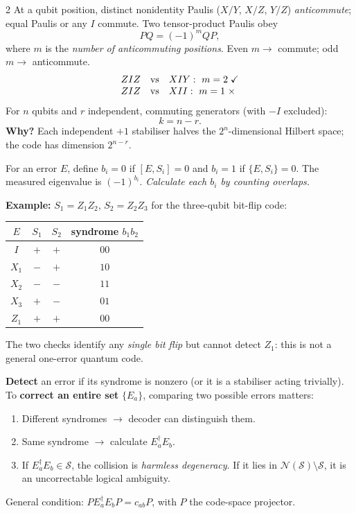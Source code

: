 \begin{multicols}{2}
At a qubit position, distinct nonidentity Paulis ($X/Y$, $X/Z$, $Y/Z$) \emph{anticommute}; equal Paulis or any $I$ commute. Two tensor-product Paulis obey
\[PQ=(-1)^mQP,\]
where $m$ is the \emph{number of anticommuting positions}. Even $m\to$ commute; odd $m\to$ anticommute.
\[\begin{array}{@{}lcl@{}}ZIZ &\text{vs}& XIY:\ m=2\;\checkmark\\ZIZ &\text{vs}& XII:\ m=1\;\times\end{array}\]
For $n$ qubits and $r$ independent, commuting generators (with $-I$ excluded):
\[\boxed{k=n-r.}\]
\textbf{Why?} Each independent $+1$ stabiliser halves the $2^n$-dimensional Hilbert space; the code has dimension $2^{n-r}$.

For an error $E$, define $b_i=0$ if $[E,S_i]=0$ and $b_i=1$ if $\{E,S_i\}=0$. The measured eigenvalue is $(-1)^{b_i}$. \emph{Calculate each $b_i$ by counting overlaps.}

\textbf{Example:} $S_1=Z_1Z_2$, $S_2=Z_2Z_3$ for the three-qubit bit-flip code:
\begin{center}\footnotesize
\begin{tabular}{@{}cccc@{}}\toprule
$E$ & $S_1$ & $S_2$ & syndrome $b_1b_2$ \\ \midrule
$I$ & $+$ & $+$ & $00$\\
$X_1$ & $-$ & $+$ & $10$\\
$X_2$ & $-$ & $-$ & $11$\\
$X_3$ & $+$ & $-$ & $01$\\
$Z_1$ & $+$ & $+$ & $00$\\
\bottomrule\end{tabular}
\end{center}
The two checks identify any \emph{single bit flip} but cannot detect $Z_1$: this is not a general one-error quantum code.

\textbf{Detect} an error if its syndrome is nonzero (or it is a stabiliser acting trivially). To \textbf{correct an entire set} $\{E_a\}$, comparing two possible errors matters:
\begin{enumerate}
\item Different syndromes $\to$ decoder can distinguish them.
\item Same syndrome $\to$ calculate $E_a^\dagger E_b$.
\item If $E_a^\dagger E_b\in\mathcal S$, the collision is \emph{harmless degeneracy}. If it lies in $\mathcal N(\mathcal S)\setminus\mathcal S$, it is an uncorrectable logical ambiguity.
\end{enumerate}
General condition: $PE_a^\dagger E_bP=c_{ab}P$, with $P$ the code-space projector.


\end{multicols}

